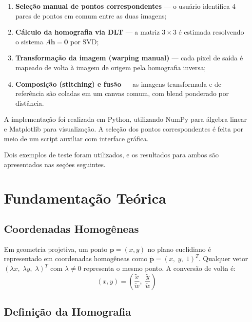 \documentclass[12pt,a4paper]{article}
\begin{document}
\begin{enumerate}
  \item \textbf{Seleção manual de pontos correspondentes} --- o usuário identifica 4
        pares de pontos em comum entre as duas imagens;
  \item \textbf{Cálculo da homografia via DLT} --- a matriz $3\times3$ é estimada
        resolvendo o sistema $A\mathbf{h}=\mathbf{0}$ por SVD;
  \item \textbf{Transformação da imagem (warping manual)} --- cada pixel de saída é
        mapeado de volta à imagem de origem pela homografia inversa;
  \item \textbf{Composição (stitching) e fusão} --- as imagens transformada e de
        referência são coladas em um canvas comum, com blend ponderado por distância.
\end{enumerate}

A implementação foi realizada em Python, utilizando NumPy para álgebra linear e
Matplotlib para visualização. A seleção dos pontos correspondentes é feita por meio
de um script auxiliar com interface gráfica.

Dois exemplos de teste foram utilizados, e os resultados para ambos são apresentados
nas seções seguintes.

\section{Fundamentação Teórica}

\subsection{Coordenadas Homogêneas}

Em geometria projetiva, um ponto $\mathbf{p}=(x,y)$ no plano euclidiano é
representado em coordenadas homogêneas como
$\tilde{\mathbf{p}}=(x,\;y,\;1)^T$.
Qualquer vetor $(\lambda x,\;\lambda y,\;\lambda)^T$ com $\lambda\neq0$ representa o
mesmo ponto. A conversão de volta é:
\begin{equation}
(x,y)=\left(\frac{\tilde{x}}{\tilde{w}},\;\frac{\tilde{y}}{\tilde{w}}\right)
\end{equation}

\subsection{Definição da Homografia}
\end{document}

